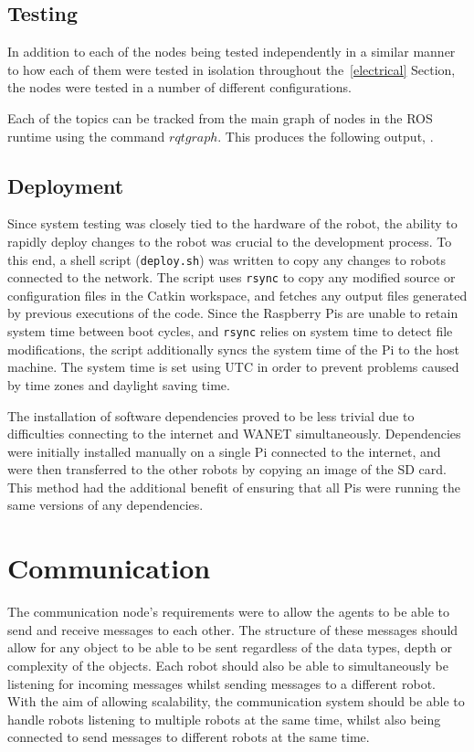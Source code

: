 \subsection{Testing}\label{soft/ROS/test}
In addition to each of the nodes being tested independently in a similar
manner to how each of them were tested in isolation throughout the~\ref{electrical}
Section, the nodes were tested in a number of different
configurations.

Each of the topics can be tracked from the main graph of nodes in the ROS
runtime using the command $rqt graph$. This produces the following output,
.


\subsection{Deployment}\label{soft/ROS/deploy}
Since system testing was closely tied to the hardware of the robot, the
ability to rapidly deploy changes to the robot was crucial to the
development process. To this end, a shell script (\verb|deploy.sh|) was
written to copy any changes to robots connected to the network. The script
uses \verb|rsync| to copy any modified source or configuration files in
the Catkin workspace, and fetches any output files generated by previous
executions of the code. Since the Raspberry Pis are unable to retain
system time between boot cycles, and \verb|rsync| relies on system time to
detect file modifications, the script additionally syncs the system time
of the Pi to the host machine. The system time is set using UTC in order
to prevent problems caused by time zones and daylight saving time.

The installation of software dependencies proved to be less trivial due to
difficulties connecting to the internet and WANET simultaneously.
Dependencies were initially installed manually on a single Pi connected to
the internet, and were then transferred to the other robots by copying an
image of the SD card. This method had the additional benefit of ensuring
that all Pis were running the same versions of any dependencies.

\section{Communication}\label{soft/comms}
The communication node's requirements were to allow the agents to
be able to send and receive messages to each other. The structure
of these messages should allow for any object to be able to be sent
regardless of the data types, depth or complexity of the objects.
Each robot should also be able to simultaneously be listening for
incoming messages whilst sending messages to a different robot.
With the aim of allowing scalability, the communication system
should be able to handle robots listening to multiple robots at the
same time, whilst also being connected to send messages to different
robots at the same time.


